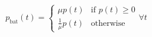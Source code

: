 \begin{equation}
	p_\text{bat}(t) =
	\begin{cases}
		\mu p(t) &\text{if } p(t) \geq 0\\
		\frac{1}{\mu}p(t) &\text{otherwise}
	\end{cases}
	\forall t
	\label{ch2:equ:battery-power}
\end{equation}